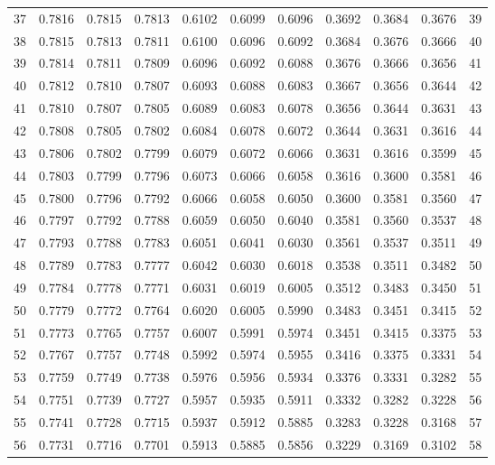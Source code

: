 \documentclass[12pt]{article}
\begin{document}
\begin{longtable}{rrrrrrrrrrr}
  37 & 0.7816 & 0.7815 & 0.7813 & 0.6102 & 0.6099 & 0.6096 & 0.3692 & 0.3684 & 0.3676 & 39 \\ 
  38 & 0.7815 & 0.7813 & 0.7811 & 0.6100 & 0.6096 & 0.6092 & 0.3684 & 0.3676 & 0.3666 & 40 \\ 
  39 & 0.7814 & 0.7811 & 0.7809 & 0.6096 & 0.6092 & 0.6088 & 0.3676 & 0.3666 & 0.3656 & 41 \\ 
  40 & 0.7812 & 0.7810 & 0.7807 & 0.6093 & 0.6088 & 0.6083 & 0.3667 & 0.3656 & 0.3644 & 42 \\ 
  41 & 0.7810 & 0.7807 & 0.7805 & 0.6089 & 0.6083 & 0.6078 & 0.3656 & 0.3644 & 0.3631 & 43 \\ 
  42 & 0.7808 & 0.7805 & 0.7802 & 0.6084 & 0.6078 & 0.6072 & 0.3644 & 0.3631 & 0.3616 & 44 \\ 
  43 & 0.7806 & 0.7802 & 0.7799 & 0.6079 & 0.6072 & 0.6066 & 0.3631 & 0.3616 & 0.3599 & 45 \\ 
  44 & 0.7803 & 0.7799 & 0.7796 & 0.6073 & 0.6066 & 0.6058 & 0.3616 & 0.3600 & 0.3581 & 46 \\ 
  45 & 0.7800 & 0.7796 & 0.7792 & 0.6066 & 0.6058 & 0.6050 & 0.3600 & 0.3581 & 0.3560 & 47 \\ 
  46 & 0.7797 & 0.7792 & 0.7788 & 0.6059 & 0.6050 & 0.6040 & 0.3581 & 0.3560 & 0.3537 & 48 \\ 
  47 & 0.7793 & 0.7788 & 0.7783 & 0.6051 & 0.6041 & 0.6030 & 0.3561 & 0.3537 & 0.3511 & 49 \\ 
  48 & 0.7789 & 0.7783 & 0.7777 & 0.6042 & 0.6030 & 0.6018 & 0.3538 & 0.3511 & 0.3482 & 50 \\ 
  49 & 0.7784 & 0.7778 & 0.7771 & 0.6031 & 0.6019 & 0.6005 & 0.3512 & 0.3483 & 0.3450 & 51 \\ 
  50 & 0.7779 & 0.7772 & 0.7764 & 0.6020 & 0.6005 & 0.5990 & 0.3483 & 0.3451 & 0.3415 & 52 \\ 
  51 & 0.7773 & 0.7765 & 0.7757 & 0.6007 & 0.5991 & 0.5974 & 0.3451 & 0.3415 & 0.3375 & 53 \\ 
  52 & 0.7767 & 0.7757 & 0.7748 & 0.5992 & 0.5974 & 0.5955 & 0.3416 & 0.3375 & 0.3331 & 54 \\ 
  53 & 0.7759 & 0.7749 & 0.7738 & 0.5976 & 0.5956 & 0.5934 & 0.3376 & 0.3331 & 0.3282 & 55 \\ 
  54 & 0.7751 & 0.7739 & 0.7727 & 0.5957 & 0.5935 & 0.5911 & 0.3332 & 0.3282 & 0.3228 & 56 \\ 
  55 & 0.7741 & 0.7728 & 0.7715 & 0.5937 & 0.5912 & 0.5885 & 0.3283 & 0.3228 & 0.3168 & 57 \\ 
  56 & 0.7731 & 0.7716 & 0.7701 & 0.5913 & 0.5885 & 0.5856 & 0.3229 & 0.3169 & 0.3102 & 58 \\ 

\end{longtable}
\end{document}
